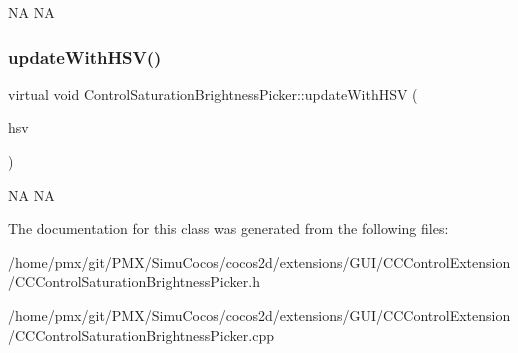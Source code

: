 NA  NA \mbox{\label{classControlSaturationBrightnessPicker_a7d5146ce64f8a27edbf48e1070890311}} 
\subsubsection{\texorpdfstring{update\+With\+H\+S\+V()}{updateWithHSV()}\hspace{0.1cm}{\footnotesize\ttfamily [2/2]}}
{\footnotesize\ttfamily virtual void Control\+Saturation\+Brightness\+Picker\+::update\+With\+H\+SV (\begin{DoxyParamCaption}\item[{\hyperlink{structHSV}{H\+SV}}]{hsv }\end{DoxyParamCaption})\hspace{0.3cm}{\ttfamily [virtual]}}

NA  NA 

The documentation for this class was generated from the following files\+:\begin{DoxyCompactItemize}
\item 
/home/pmx/git/\+P\+M\+X/\+Simu\+Cocos/cocos2d/extensions/\+G\+U\+I/\+C\+C\+Control\+Extension/C\+C\+Control\+Saturation\+Brightness\+Picker.\+h\item 
/home/pmx/git/\+P\+M\+X/\+Simu\+Cocos/cocos2d/extensions/\+G\+U\+I/\+C\+C\+Control\+Extension/C\+C\+Control\+Saturation\+Brightness\+Picker.\+cpp\end{DoxyCompactItemize}
